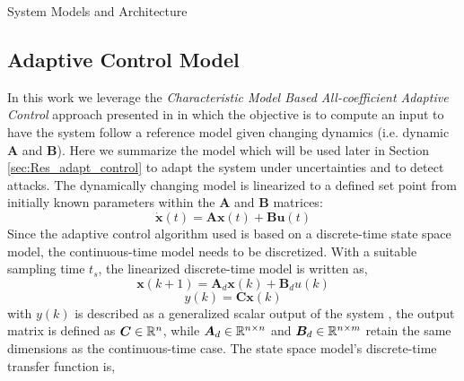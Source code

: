 \begin{section}{System Models and Architecture}
\subsection{Adaptive Control Model}
In this work we leverage the \textit{Characteristic Model Based All-coefficient Adaptive Control} approach presented in \cite{4106038} in which the objective is to compute an input to have the system follow a reference model given changing dynamics (i.e. dynamic $\bm{A}$ and  $\bm{B}$). Here we summarize the model which will be used later in Section \ref{sec:Res_adapt_control} to adapt the system under uncertainties and to detect attacks. The dynamically changing model is linearized to a defined set point from initially known parameters within the $\bm{A}$ and $\bm{B}$ matrices:
	\begin{equation}
	\dot{\bm{x}}(t) = \bm{A}\bm{x}(t) + \bm{B}\bm{u}(t)
	\end{equation}
Since the adaptive control algorithm used is based on a discrete-time state space model, the continuous-time model needs to be discretized. With a suitable sampling time $t_s$, the linearized discrete-time model is written as,
    \begin{equation}
	\bm{x}(k+1) = \bm{A}_d\bm{x}(k) + \bm{B}_du(k)
	\end{equation}
	\begin{equation}
	y(k)=\bm{C}\bm{x}(k)
	\end{equation}
with $y(k)$ is described as a generalized scalar output of the system , the output matrix is defined as $\bm{C} \in \mathbb{R}^{n}$, while $\bm{A}_d \in \mathbb{R}^{n\times n}$ and $\bm{B}_d \in \mathbb{R}^{n\times m}$ retain the same dimensions as the continuous-time case. The state space model's discrete-time transfer function is,


\end{section}
